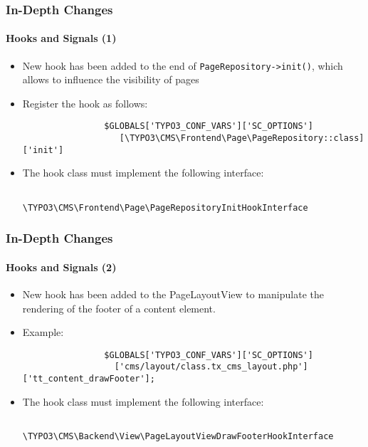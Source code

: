 \begin{frame}[fragile]
	\frametitle{In-Depth Changes}
	\framesubtitle{Hooks and Signals (1)}

	\begin{itemize}

		\item New hook has been added to the end of \texttt{PageRepository->init()},
			which allows to influence the visibility of pages

		\item Register the hook as follows:
			\begin{lstlisting}
				$GLOBALS['TYPO3_CONF_VARS']['SC_OPTIONS']
				   [\TYPO3\CMS\Frontend\Page\PageRepository::class]['init']
			\end{lstlisting}

		\item The hook class must implement the following interface:
			\begin{lstlisting}
				\TYPO3\CMS\Frontend\Page\PageRepositoryInitHookInterface
			\end{lstlisting}

	\end{itemize}

\end{frame}


\begin{frame}[fragile]
	\frametitle{In-Depth Changes}
	\framesubtitle{Hooks and Signals (2)}

	\begin{itemize}

		\item New hook has been added to the PageLayoutView to manipulate the rendering
			of the footer of a content element.

		\item Example:
			\begin{lstlisting}
				$GLOBALS['TYPO3_CONF_VARS']['SC_OPTIONS']
				  ['cms/layout/class.tx_cms_layout.php']['tt_content_drawFooter'];
			\end{lstlisting}

		\item The hook class must implement the following interface:
			\begin{lstlisting}
				\TYPO3\CMS\Backend\View\PageLayoutViewDrawFooterHookInterface
			\end{lstlisting}

	\end{itemize}

\end{frame}

